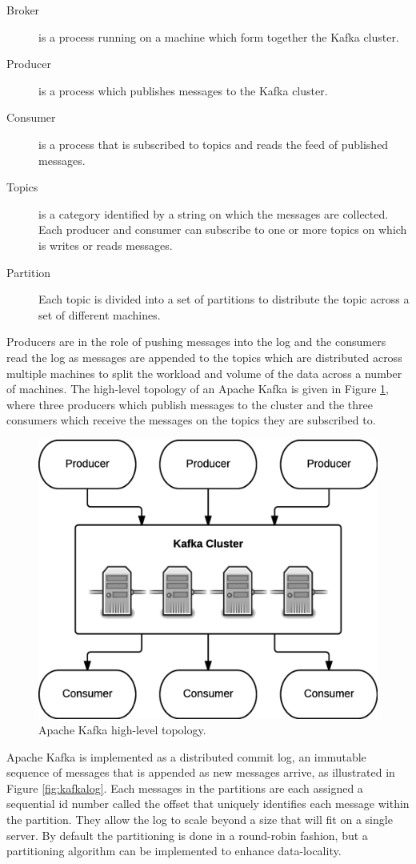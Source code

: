 \begin{description}
    \item[Broker] is a process running on a machine which form together the Kafka cluster. 
    \item[Producer] is a process which publishes messages to the Kafka cluster.
    \item[Consumer] is a process that is subscribed to topics and reads the feed of published messages.
    \item[Topics] is a category identified by a string on which the messages are collected. Each producer and consumer can subscribe to one or more topics on which is writes or reads messages.
    \item[Partition] Each topic is divided into a set of partitions to distribute the topic across a set of different machines.
\end{description}

Producers are in the role of pushing messages into the log and the consumers read the log as messages are appended to the topics which are distributed across multiple machines to split the workload and volume of the data across a number of machines. The high-level topology of an Apache Kafka is given in Figure \ref{fig:kafka}, where three producers which publish messages to the cluster and the three consumers which receive the messages on the topics they are subscribed to.

\begin{figure}[ht!]
\centering
\includegraphics[width=.7\textwidth]{figures/kafka.png}
\caption{Apache Kafka high-level topology. \label{fig:kafka}}
\end{figure}

Apache Kafka is implemented as a distributed commit log, an immutable sequence of messages that is appended as new messages arrive, as illustrated in Figure \ref{fig:kafkalog}. Each messages in the partitions are each assigned a sequential id number called the offset that uniquely identifies each message within the partition. They allow the log to scale beyond a size that will fit on a single server. By default the partitioning is done in a round-robin fashion, but a partitioning algorithm can be implemented to enhance data-locality. 


